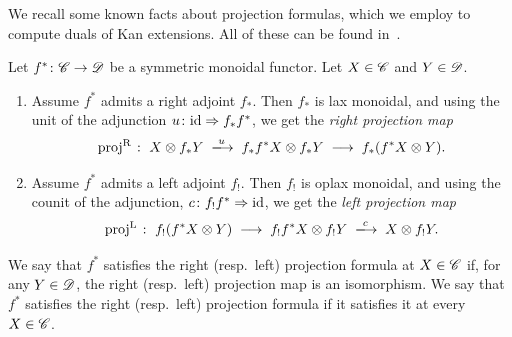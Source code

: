 \documentclass[english,svgnames,table]{article}
\begin{document}
    We recall some known facts about projection formulas, which we employ to compute duals of Kan extensions. All of these can be found in~\cite{Fausk-Hu-May-2003-6FF}. 

    \begin{definition}
        Let $f^* \colon \mathscr{C} \to \mathscr{D}$ be a symmetric monoidal functor. Let $X \in \mathscr{C}$ and $Y \in \mathscr{D}$.
        \begin{enumerate}
            \item Assume $f^*$ admits a right adjoint $f_*$. Then $f_*$ is lax monoidal, and using the unit of the adjunction $u\colon \mathrm{id} \Rightarrow f_* f^*$, we get the \emph{right projection map}
            \begin{equation*}
                \Rproj \;\colon\; X \otimes f_* Y \;\xtoo{u}\; f_* f^* X \otimes f_* Y \;\too\; f_*(f^*X \otimes Y).
            \end{equation*}

            \item Assume $f^*$ admits a left adjoint $f_!$. Then $f_!$ is oplax monoidal, and using the counit of the adjunction, $c \colon f_! f^* \Rightarrow \mathrm{id}$, we get the \emph{left projection map}
            \begin{equation*}
                \Lproj \;\colon\; f_!(f^* X \otimes Y) \;\too\; f_! f^*X \otimes f_! Y \;\xtoo{c}\; X \otimes f_! Y.
            \end{equation*}
        \end{enumerate}
        We say that $f^*$ satisfies the right (resp.\ left) projection formula at $X \in \mathscr{C}$ if, for any $Y \in \mathscr{D}$, the right (resp.\ left) projection map is an isomorphism. We say that $f^*$ satisfies the right (resp.\ left) projection formula if it satisfies it at every $X\in \mathscr{C}$. 
    \end{definition}
\end{document}
